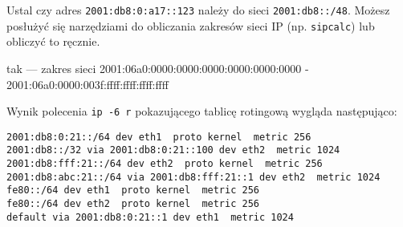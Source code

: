 % 
% 
% 
% 



\dbEntryCheckResults
Ustal czy adres \Verb$2001:db8:0:a17::123$ należy do sieci \Verb$2001:db8::/48$. Możesz posłużyć się narzędziami do obliczania zakresów sieci IP (np. \Verb#sipcalc#) lub obliczyć to ręcznie.
\fi

\dbEntryCheckResults
tak --- zakres sieci 2001:06a0:0000:0000:0000:0000:0000:0000 - 2001:06a0:0000:003f:ffff:ffff:ffff:ffff
\fi


\dbEntryCheckResults
Wynik polecenia \Verb#ip -6 r# pokazującego tablicę rotingową wygląda następująco:
\begin{Verbatim}
2001:db8:0:21::/64 dev eth1  proto kernel  metric 256 
2001:db8::/32 via 2001:db8:0:21::100 dev eth2  metric 1024 
2001:db8:fff:21::/64 dev eth2  proto kernel  metric 256 
2001:db8:abc:21::/64 via 2001:db8:fff:21::1 dev eth2  metric 1024 
fe80::/64 dev eth1  proto kernel  metric 256 
fe80::/64 dev eth2  proto kernel  metric 256 
default via 2001:db8:0:21::1 dev eth1  metric 1024 
\end{Verbatim}

